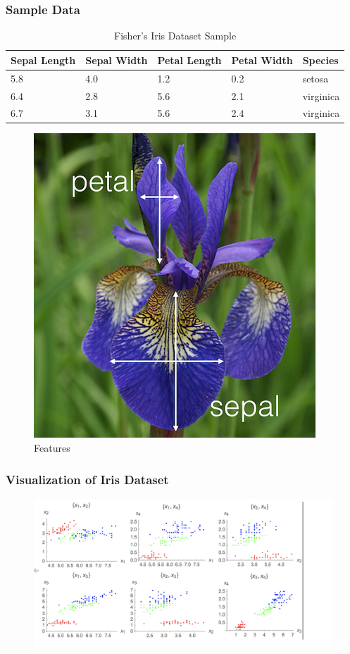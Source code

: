 \documentclass{beamer}
\begin{document}
\begin{frame}
\frametitle{Sample Data}

\begin{table}
\begin{tabular}{lllll}
\hline
\textbf{Sepal Length} & \textbf{ Sepal Width } & \textbf{Petal Length} & \textbf{Petal Width} & \textbf{Species}\\
\hline
5.8 & 4.0 & 1.2 & 0.2 & setosa\\
6.4 & 2.8 & 5.6 & 2.1 & virginica\\
6.7 & 3.1 & 5.6 & 2.4 & virginica \\
\hline
\end{tabular}
\caption{Fisher's Iris Dataset Sample}
\end{table}

\begin{figure}[htbp]
\centering
\includegraphics[scale=.23]{graphics/iris_feature} \caption{Features}
\end{figure}


\end{frame}
\begin{frame}
\frametitle{Visualization of Iris Dataset}
\begin{figure}[t]
\includegraphics[scale=0.5]{graphics/feature_vis}
\centering
\end{figure}
\end{frame}
\end{document}
